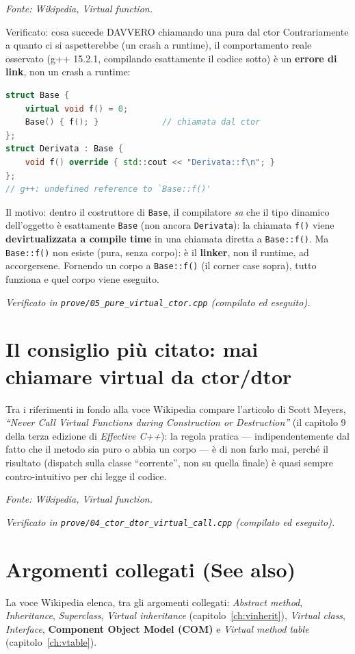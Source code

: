 \documentclass{report}
\newcommand{\code}[1]{\texttt{\small #1}}
\newcommand{\fontewiki}[1][Virtual function]{{\footnotesize\itshape\color{gray} Fonte: Wikipedia, \emph{#1}.\par}}
\newcommand{\fonteprove}[1]{{\footnotesize\itshape\color{gray} Verificato in \code{prove/#1} (compilato ed eseguito).\par}}
\begin{document}
\fontewiki

\begin{Example}{Verificato: cosa succede DAVVERO chiamando una pura dal ctor}{}
Contrariamente a quanto ci si aspetterebbe (un crash a runtime), il
comportamento reale osservato (g++ 15.2.1, compilando esattamente il
codice sotto) è un \textbf{errore di link}, non un crash a runtime:
\begin{lstlisting}[language=C++]
struct Base {
    virtual void f() = 0;
    Base() { f(); }             // chiamata dal ctor
};
struct Derivata : Base {
    void f() override { std::cout << "Derivata::f\n"; }
};
// g++: undefined reference to `Base::f()'
\end{lstlisting}
Il motivo: dentro il costruttore di \code{Base}, il compilatore \emph{sa}
che il tipo dinamico dell'oggetto è esattamente \code{Base} (non ancora
\code{Derivata}): la chiamata \code{f()} viene \textbf{devirtualizzata a
compile time} in una chiamata diretta a \code{Base::f()}. Ma
\code{Base::f()} non esiste (pura, senza corpo): è il \textbf{linker},
non il runtime, ad accorgersene. Fornendo un corpo a \code{Base::f()}
(il corner case sopra), tutto funziona e quel corpo viene eseguito.
\end{Example}

\fonteprove{05\_pure\_virtual\_ctor.cpp}

\section{Il consiglio più citato: mai chiamare virtual da ctor/dtor}

Tra i riferimenti in fondo alla voce Wikipedia compare l'articolo di
Scott Meyers, \emph{``Never Call Virtual Functions during Construction or
Destruction''} (il capitolo 9 della terza edizione di \emph{Effective
C++}): la regola pratica --- indipendentemente dal fatto che il metodo sia
puro o abbia un corpo --- è di non farlo mai, perché il risultato
(dispatch sulla classe ``corrente'', non su quella finale) è quasi sempre
contro-intuitivo per chi legge il codice.

\fontewiki

\fonteprove{04\_ctor\_dtor\_virtual\_call.cpp}

\section{Argomenti collegati (See also)}

La voce Wikipedia elenca, tra gli argomenti collegati: \emph{Abstract
method}, \emph{Inheritance}, \emph{Superclass}, \emph{Virtual
inheritance} (capitolo~\ref{ch:vinherit}), \emph{Virtual class},
\emph{Interface}, \textbf{Component Object Model (COM)} e \emph{Virtual
method table} (capitolo~\ref{ch:vtable}).
\end{document}
